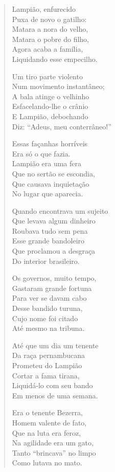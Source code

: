 \begin{verse}
Lampião, enfurecido\\
Puxa de novo o gatilho:\\
Matara a nora do velho,\\
Matara o pobre do filho,\\
Agora acaba a família,\\
Liquidando esse empecilho.

Um tiro parte violento\\
Num movimento instantâneo;\\
A bala atinge o velhinho\\
Esfacelando-lhe o crânio\\
E Lampião, debochando\\
Diz: “Adeus, meu conterrâneo!”

Essas façanhas horríveis\\
Era só o que fazia.\\
Lampião era uma fera\\
Que no sertão se escondia,\\
Que causava inquietação\\
No lugar que aparecia.


Quando encontrava um sujeito\\
Que levava algum dinheiro\\
Roubava tudo sem pena\\
Esse grande bandoleiro\\
Que proclamou a desgraça\\
Do interior brasileiro.

Os governos, muito tempo,\\
Gastaram grande fortuna\\
Para ver se davam cabo\\
Desse bandido turuna,\\
Cujo nome foi citado\\
Até mesmo na tribuna.

Até que um dia um tenente\\
Da raça pernambucana\\
Prometeu do Lampião\\
Cortar a fama tirana,\\
Liquidá-lo com seu bando\\
Em menos de uma semana.

Era o tenente Bezerra,\\
Homem valente de fato,\\
Que na luta era feroz,\\
Na agilidade era um gato,\\
Tanto “brincava” no limpo\\
Como lutava no mato.



\end{verse}
